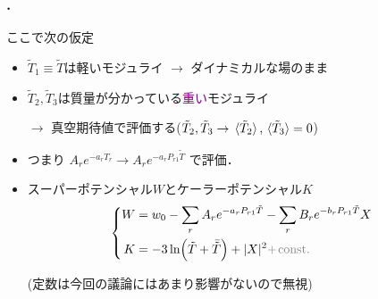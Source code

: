 \documentclass[
  a4paper,uplatex,dvipdfmx,9pt,
  xcolor = {dvipsnames,svgnames},
  hyperref ={colorlinks=true,citecolor=Navy,linkcolor=NavyBlue,urlcolor=purple}
]{beamer}
\begin{document}
\begin{frame}
  \frametitle{\thesection.\thesubsection\ \subsecname}

    \begin{boxmine}{ここで次の仮定}
      \begin{itemize}
        \item 
        $\tilde{T}_{1}\equiv\tilde{T}$は軽いモジュライ
        $\rightarrow$
        ダイナミカルな場のまま
    
        \item
        $\tilde{T}_{2},\tilde{T}_{3}$は質量が分かっている\textcolor{DarkMagenta}{重い}モジュライ
    
        \hspace{1cm}
        $\rightarrow$            
        真空期待値で評価する($\tilde{T}_{2},\tilde{T}_{3}\rightarrow\ev*{\tilde{T}_{2}},\ev*{\tilde{T}_{3}}=0$)
      \end{itemize}
    \end{boxmine}

  \begin{itemize}
    \item 
    つまり
    $
      \displaystyle
      A_{r}e^{-a_{r}T_{r}}
      \rightarrow
      A_{r}e^{-a_{r}P_{r1}\tilde{T}}
    $
    で評価．
    \item 
    スーパーポテンシャル$W$とケーラーポテンシャル$K$
    \begin{equation}
      \left\{
        \begin{alignedat}{1}
          W
          &=
          w_{0}
          -
          \sum_{r}
          A_{r}
          e^{-a_{r}P_{r1}\tilde{T}}
          -
          \sum_{r}B_{r}e^{-b_{r}P_{r1}\tilde{T}}
          X
          \\
          K
          &=
          -
          3\ln (\tilde{T}+\bar{\tilde{T}})
          +
          |X|^2
          \textcolor{gray}{
            +
            \hspace{1pt}
            \text{const.}
          }
        \end{alignedat}
      \right.
      \nonumber
    \end{equation}
    \begin{center}
      (定数は今回の議論にはあまり影響がないので無視)
    \end{center}
  \end{itemize}
\end{frame}
\end{document}
